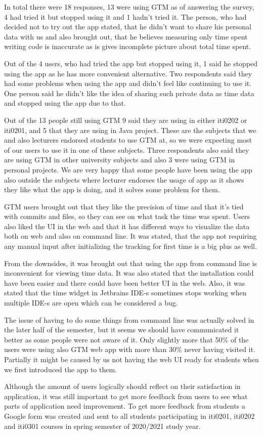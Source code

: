 In total there were 18 responses, 13 were using GTM as of answering the survey, 4 had tried it but stopped using it and 1 hadn't tried it.
The person, who had decided not to try out the app stated, that he didn't want to share his personal data with us and also brought out,
that he believes measuring only time spent writing code is inaccurate as is gives incomplete picture about total time spent.

Out of the 4 users, who had tried the app but stopped using it, 1 said he stopped using the app as he has more convenient alternative.
Two respondents said they had some problems when using the app and didn't feel like continuing to use it.
One person said he didn't like the idea of sharing such private data as time data and stopped using the app due to that.

Out of the 13 people still using GTM 9 said they are using in either iti0202 or iti0201, and 5 that they are using in Java project.
These are the subjects that we and also lecturers endorsed students to use GTM at, so we were expecting most of our
users to use it in one of these subjects.
Three respondents also said they are using GTM in other university subjects and also 3 were using GTM in personal projects.
We are very happy that some people have been using the app also outside the subjects where lecturer endorses the usage of app
as it shows they like what the app is doing, and it solves some problem for them.

GTM users brought out that they like the precision of time and that it's tied with commits and files, so they can see
on what task the time was spent.
Users also liked the UI in the web and that it has different ways to visualize the data both on web and also on command line.
It was stated, that the app not requiring any manual input after initializing the tracking for first time is a big plus as well.

From the downsides, it was brought out that using the app from command line is inconvenient for viewing time data.
It was also stated that the installation could have been easier and there could have been better UI in the web.
Also, it was stated that the time widget in Jetbrains IDE-s sometimes stops working when multiple IDE-s are open
which can be considered a bug.

The issue of having to do some things from command line was actually solved in the later half of the semester, but it seems
we should have communicated it better as some people were not aware of it.
Only slightly more that 50\% of the users were using also GTM web app with more than 30\% never having visited it.
Partially it might be caused by us not having the web UI ready for students when we first introduced the app to them.

Although the amount of users logically should reflect on their satisfaction in application, it was still important to
get more feedback from users to see what parts of application need improvement.
To get more feedback from students a Google form was created and sent to all students participating in iti0201, iti0202
and iti0301 courses in spring semester of 2020/2021 study year.


